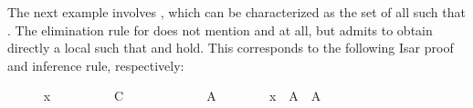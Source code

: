 \begin{isabellebody}
\begin{isamarkuptext}
  \medskip The next example involves , which can be
  characterized as the set of all  such that .  The elimination rule for  does
  not mention  and  at all, but admits to obtain
  directly a local  such that  and  hold.  This corresponds to the following Isar proof and
  inference rule, respectively:%
\end{isamarkuptext}%
\isamarkuptrue%
%
\medskip\begin{minipage}{0.6\textwidth}
%
\isadelimproof
\ \ \ \ %
\endisadelimproof
%
\isatagproof
{}\isamarkupfalse%
\ {}x\ {}\ {}{}{}\isanewline
\ \ \ \ \isamarkupfalse%
\ \isamarkupfalse%
\ C\isanewline
\ \ \ \ \isamarkupfalse%
\isanewline
\ \ \ \ \ \ \isamarkupfalse%
\ A\isanewline
\ \ \ \ \ \ \isamarkupfalse%
\ {}x\ {}\ A{}\ \ {}A\ {}\ {}{}\isanewline

\end{minipage}
\end{isabellebody}
